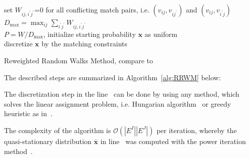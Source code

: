 \begin{algorithm}[h] 
	set $W_{ij,i^\prime j^\prime}$=0 for all conflicting match pairs, i.e. $(v_{ij},v_{ij^\prime})$ and $(v_{ij},v_{i^\prime j})$ \\
	$D_{\text{max}}=\max_{ij}\sum_{i^\prime j^\prime}W_{ij,i^\prime j^\prime}$ \\
	$P=W/D_{\text{max}}$, initialize starting probability $\mathbf{x}$ as uniform\\
	discretize $\mathbf{x}$ by the matching constraints %
	\caption{Reweighted Random Walks Method, compare to~\cite{Cho2010_RRWM}}    
	\label{alg:RRWM}
\end{algorithm}

The described steps are summarized in Algorithm~\ref{alg:RRWM} below:

The discretization step in the line~ can be done by using any method, which solves the linear assignment problem, i.e. Hungarian algorithm~\cite{Kuhn1955} or greedy heuristic as in~\cite{Leordeanu2005_SM}.

The complexity of the algorithm is $\mathcal{O}(|E^I||E^J|)$ per iteration, whereby the quasi-stationary distribution $\mathbf{\bar{x}}$ in line~ was computed with the power iteration method~\cite{PowerIteration}.

